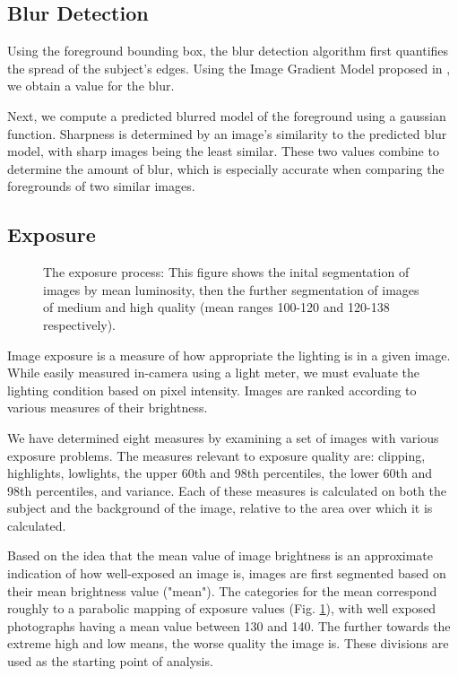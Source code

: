 \documentclass{article}
\begin{document}
\subsection{Blur Detection}
Using the foreground bounding box, the blur detection algorithm first quantifies the spread of the subject's edges. Using the Image Gradient Model proposed in \cite{springerlink:10.1007/978-3-540-77409-9_26}, we obtain a value for the blur.

Next, we compute a predicted blurred model of the foreground using a gaussian function. Sharpness is determined by an image's similarity to the predicted blur model, with sharp images being the least similar. These two values combine to determine the amount of blur, which is especially accurate when comparing the foregrounds of two similar images.

\subsection{Exposure}
\begin{figure}
  \centering
    \caption{The exposure process: This figure shows the inital segmentation of images by mean luminosity, then the further segmentation of images of medium and high quality (mean ranges 100-120 and 120-138 respectively).}
    \label{exposurefigure}
\end{figure}
Image exposure is a measure of how appropriate the lighting is in a given image. While easily measured in-camera using a light meter, we must evaluate the lighting condition based on pixel intensity. Images are ranked according to various measures of their brightness. %

We have determined eight measures by examining a set of images with various exposure problems. The measures relevant to exposure quality are: clipping, highlights, lowlights, the upper 60th and 98th percentiles, the lower 60th and 98th percentiles, and variance. Each of these measures is calculated on both the subject and the background of the image, relative to the area over which it is calculated.

Based on the idea that the mean value of image brightness is an approximate indication of how well-exposed an image is, images are first segmented based on their mean brightness value ("mean"). The categories for the mean correspond roughly to a parabolic mapping of exposure values (Fig. \ref{exposurefigure}), with well exposed photographs having a mean value between 130 and 140. The further towards the extreme high and low means, the worse quality the image is. These divisions are used as the starting point of analysis. %
\end{document}
